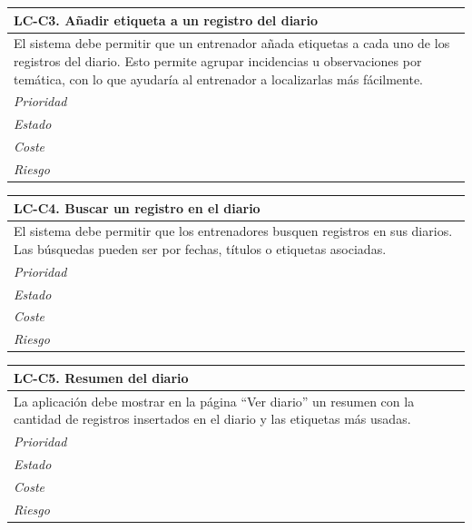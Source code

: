 	\begin{center}
		\begin{tabularx}{15cm}{|X|}
			\hline 
				\bf{LC-C3. Añadir etiqueta a un registro del diario}\\
			\hline
				El sistema debe permitir que un entrenador añada etiquetas a cada uno de los registros del diario. Esto permite agrupar incidencias u observaciones por temática, con lo que ayudaría al entrenador a localizarlas más fácilmente.\\
			\hline
				\it{Prioridad}\\
			\hline
				\it{Estado}\\
			\hline
				\it{Coste}\\
			\hline
				\it{Riesgo}\\
			\hline
		\end{tabularx}
	\end{center}
	
	\begin{center}
		\begin{tabularx}{15cm}{|X|}
			\hline 
				\bf{LC-C4. Buscar un registro en el diario}\\
			\hline
				El sistema debe permitir que los entrenadores busquen registros en sus diarios. Las búsquedas pueden ser por fechas, títulos o etiquetas asociadas.\\
			\hline
				\it{Prioridad}\\
			\hline
				\it{Estado}\\
			\hline
				\it{Coste}\\
			\hline
				\it{Riesgo}\\
			\hline
		\end{tabularx}
	\end{center}
	
	\begin{center}
		\begin{tabularx}{15cm}{|X|}
			\hline 
				\bf{LC-C5. Resumen del diario}\\
			\hline
				La aplicación debe mostrar en la página ``Ver diario'' un resumen con la cantidad de registros insertados en el diario y las etiquetas más usadas.\\
			\hline
				\it{Prioridad}\\
			\hline
				\it{Estado}\\
			\hline
				\it{Coste}\\
			\hline
				\it{Riesgo}\\
			\hline
		\end{tabularx}
	\end{center}
	
